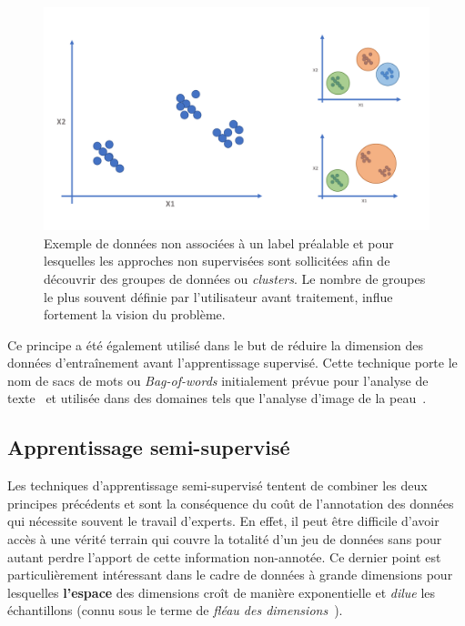 \begin{figure}[H]
    \centering
    \includegraphics[width=0.75\linewidth]{contents/chapter_3/resources/scheme_unsupervised.pdf}
    \caption{Exemple de données non associées à un label préalable et pour lesquelles les approches non supervisées sont sollicitées afin de découvrir des groupes de données ou \textit{clusters}. Le nombre de groupes le plus souvent définie par l’utilisateur avant traitement, influe fortement la vision du problème.}
    \label{fig:scheme_unsupervised}
\end{figure}

Ce principe a été également utilisé dans le but de réduire la dimension des données d'entraînement avant l'apprentissage supervisé. Cette technique porte le nom de sacs de mots ou \textit{Bag-of-words} initialement prévue pour l'analyse de texte~\cite{Zhang2010} et utilisée dans des domaines tels que l'analyse d'image de la peau~\cite{Situ2008}.\par

\subsection{Apprentissage semi-supervisé}
\label{sec:semisupervised_learning}
Les techniques d'apprentissage semi-supervisé tentent de combiner les deux principes précédents et sont la conséquence du coût de l'annotation des données qui nécessite souvent le travail d'experts. En effet, il peut être difficile d'avoir accès à une vérité terrain qui couvre la totalité d'un jeu de données sans pour autant perdre l'apport de cette information non-annotée. Ce dernier point est particulièrement intéressant dans le cadre de données à grande dimensions pour lesquelles \textbf{l'espace} des dimensions croît de manière exponentielle et \textit{dilue} les échantillons (connu sous le terme de \textit{fléau des dimensions}~\cite{Donoho2000}).\par 

